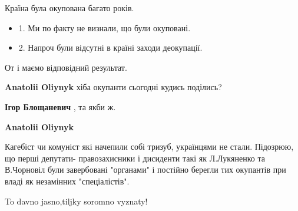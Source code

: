 \begin{itemize}
Країна була окупована багато років.

\begin{itemize}
  \item 1. Ми по факту не визнали, що були окуповані.
  \item 2. Напроч були відсутні в країні заходи деокупації.
\end{itemize}

От і маємо відповідний результат.

\begin{itemize}
 
\textbf{Anatolii Oliynyk} хіба окупанти сьогодні кудись поділись?

 
\textbf{Ігор Блощаневич} , та якби ж.

 
\textbf{Anatolii Oliynyk} 

Кагебіст чи комуніст які начепили собі тризуб, українцями не стали. Підозрюю,
що перші депутати- правозахисники і дисиденти такі як Л.Лукяненко та В.Чорновіл
були завербовані "органами" і постійно берегли тих окупантів при владі як
незамінних "спеціалістів".


 
To davno jasno,tiljky soromno vyznaty!
\end{itemize}

 


\end{itemize}
